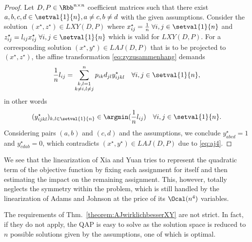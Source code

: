 \begin{proof}
	Let $D, P\in\Rbb^{n\times n}$ coefficient matrices such that there exist $a,b,c,d \in\setval{1}{n},a\neq c, b\neq d$ with the given assumptions. Consider the solution $(x^\star, z^\star)\in LXY(D,P)$ where $x^\star_{ij}=\frac{1}{n}\;\forall i,j\in\setval{1}{n}$ and $z^\star_{ij} = l_{ij}x^\star_{ij}\;\forall i,j\in\setval{1}{n}$ which is valid for $LXY(D,P)$. For a corresponding solution $(x^\star, y^\star)\in LAJ(D,P)$ that is to be projected to $(x^\star, z^\star)$, the affine transformation \eqref{eq:zyzusammenhang} demands
	\begin{equation*}
		\frac{1}{n}l_{ij} = \sum_{\substack{k,l=1\\k\neq i, l\neq j}}^np_{ik}d_{jl}y^\star_{ijkl}\quad\forall i,j\in\setval{1}{n},
	\end{equation*}
	in other words
	\begin{equation*}
		(y^\star_{ijkl})_{k,l \in\setval{1}{n}}\in\argmin(\frac{1}{n}l_{ij})\quad\forall i,j\in\setval{1}{n}.
	\end{equation*}
	Considering pairs $(a,b)$ and $(c,d)$ and the assumptions, we conclude $y^\star_{abcd} = 1$ and $y^\star_{cdab} = 0$,	which contradicts $(x^\star, y^\star)\in LAJ(D,P)$ due to \eqref{eq:aj4}.
\end{proof}

We see that the linearization of Xia and Yuan tries to represent the quadratic term of the objective function by fixing each assignment for itself and then estimating the impact on the remaining assignment. This, however, totally neglects the symmetry within the problem, which is still handled by the linearization of Adams and Johnson at the price of its $\Ocal(n^4)$ variables.

\begin{remark}
	The requirements of Thm.~\ref{theorem:AJwirklichbesserXY} are not strict. In fact, if they do not apply, the QAP is easy to solve as the solution space is reduced to $n$ possible solutions given by the assumptions, one of which is optimal.
\end{remark}

